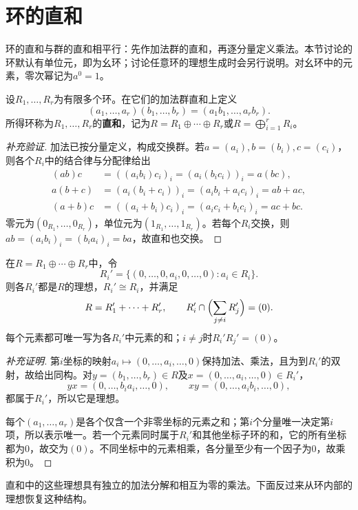 \section{环的直和}

环的直和与群的直和相平行：先作加法群的直和，再逐分量定义乘法。本节讨论的环默认有单位元，即为幺环；讨论任意环的理想生成时会另行说明。对幺环中的元素，零次幂记为$a^0=1$。

\begin{definition}
设$R_1,\ldots,R_r$为有限多个环。在它们的加法群直和上定义
\[
(a_1,\ldots,a_r)(b_1,\ldots,b_r)=(a_1b_1,\ldots,a_rb_r).
\]
所得环称为$R_1,\ldots,R_r$的\textbf{直和}，记为$R=R_1\oplus\cdots\oplus R_r$或$R=\bigoplus_{i=1}^rR_i$。
\end{definition}
\begin{proof}[补充验证]
加法已按分量定义，构成交换群。若$a=(a_i),b=(b_i),c=(c_i)$，则各个$R_i$中的结合律与分配律给出
\begin{align*}
(ab)c&=((a_ib_i)c_i)_i=(a_i(b_ic_i))_i=a(bc),\\
a(b+c)&=(a_i(b_i+c_i))_i=(a_ib_i+a_ic_i)_i=ab+ac,\\
(a+b)c&=((a_i+b_i)c_i)_i=(a_ic_i+b_ic_i)_i=ac+bc.
\end{align*}
零元为$(0_{R_1},\ldots,0_{R_r})$，单位元为$(1_{R_1},\ldots,1_{R_r})$。若每个$R_i$交换，则$ab=(a_ib_i)_i=(b_ia_i)_i=ba$，故直和也交换。
\end{proof}

\begin{proposition}
在$R=R_1\oplus\cdots\oplus R_r$中，令
\[
R_i'=\{(0,\ldots,0,a_i,0,\ldots,0):a_i\in R_i\}.
\]
则各$R_i'$都是$R$的理想，$R_i'\cong R_i$，并满足
\[
R=R_1'+\cdots+R_r',\qquad
R_i'\cap\Bigl(\sum_{j\ne i}R_j'\Bigr)=(0).
\]
每个元素都可唯一写为各$R_i'$中元素的和；$i\ne j$时$R_i'R_j'=(0)$。
\end{proposition}
\begin{proof}[补充证明]
第$i$坐标的映射$a_i\mapsto(0,\ldots,a_i,\ldots,0)$保持加法、乘法，且为到$R_i'$的双射，故给出同构。对$y=(b_1,\ldots,b_r)\in R$及$x=(0,\ldots,a_i,\ldots,0)\in R_i'$，
\[
yx=(0,\ldots,b_ia_i,\ldots,0),\qquad
xy=(0,\ldots,a_ib_i,\ldots,0),
\]
都属于$R_i'$，所以它是理想。

每个$(a_1,\ldots,a_r)$是各个仅含一个非零坐标的元素之和；第$i$个分量唯一决定第$i$项，所以表示唯一。若一个元素同时属于$R_i'$和其他坐标子环的和，它的所有坐标都为0，故交为$(0)$。不同坐标中的元素相乘，各分量至少有一个因子为0，故乘积为0。
\end{proof}

直和中的这些理想具有独立的加法分解和相互为零的乘法。下面反过来从环内部的理想恢复这种结构。

